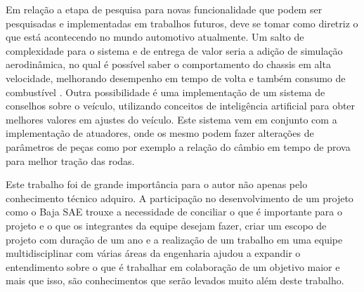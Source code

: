 Em relação a etapa de pesquisa para novas funcionalidade que podem ser pesquisadas e implementadas em trabalhos futuros, deve se tomar como diretriz o que está acontecendo no mundo automotivo atualmente. Um salto de complexidade para o sistema e de entrega de valor seria a adição de simulação aerodinâmica, no qual é possível saber o comportamento do chassis em alta velocidade, melhorando desempenho em tempo de volta e também consumo de combustível \cite{wang2018aerodynamic}. Outra possibilidade é uma implementação de um sistema de conselhos sobre o veículo, utilizando conceitos de inteligência artificial para obter melhores valores em ajustes do veículo. Este sistema vem em conjunto com a implementação de atuadores, onde os mesmo podem fazer alterações de parâmetros de peças como por exemplo a relação do câmbio em tempo de prova para melhor tração das rodas.   

Este trabalho foi de grande importância para o autor não apenas pelo conhecimento técnico adquiro. A participação no desenvolvimento de um projeto como o Baja SAE trouxe a necessidade de conciliar o que é importante para o projeto e o que os integrantes da equipe desejam fazer, criar um escopo de projeto com duração de um ano e a realização de um trabalho em uma equipe multidisciplinar com várias áreas da engenharia ajudou a expandir o entendimento sobre o que é trabalhar em colaboração de um objetivo maior e mais que isso, são conhecimentos que serão levados muito além deste trabalho.   